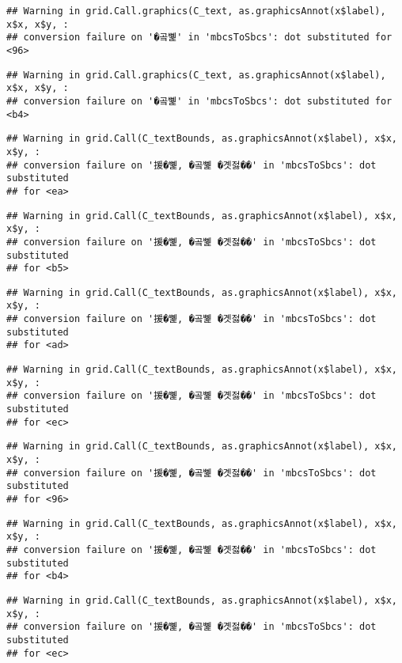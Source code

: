 \documentclass[
]{article}
\begin{document}
\begin{verbatim}
## Warning in grid.Call.graphics(C_text, as.graphicsAnnot(x$label), x$x, x$y, :
## conversion failure on '�곸뼱' in 'mbcsToSbcs': dot substituted for <96>
\end{verbatim}

\begin{verbatim}
## Warning in grid.Call.graphics(C_text, as.graphicsAnnot(x$label), x$x, x$y, :
## conversion failure on '�곸뼱' in 'mbcsToSbcs': dot substituted for <b4>
\end{verbatim}

\begin{verbatim}
## Warning in grid.Call(C_textBounds, as.graphicsAnnot(x$label), x$x, x$y, :
## conversion failure on '援�뼱, �곸뼱 �곗젏��' in 'mbcsToSbcs': dot substituted
## for <ea>
\end{verbatim}

\begin{verbatim}
## Warning in grid.Call(C_textBounds, as.graphicsAnnot(x$label), x$x, x$y, :
## conversion failure on '援�뼱, �곸뼱 �곗젏��' in 'mbcsToSbcs': dot substituted
## for <b5>
\end{verbatim}

\begin{verbatim}
## Warning in grid.Call(C_textBounds, as.graphicsAnnot(x$label), x$x, x$y, :
## conversion failure on '援�뼱, �곸뼱 �곗젏��' in 'mbcsToSbcs': dot substituted
## for <ad>
\end{verbatim}

\begin{verbatim}
## Warning in grid.Call(C_textBounds, as.graphicsAnnot(x$label), x$x, x$y, :
## conversion failure on '援�뼱, �곸뼱 �곗젏��' in 'mbcsToSbcs': dot substituted
## for <ec>
\end{verbatim}

\begin{verbatim}
## Warning in grid.Call(C_textBounds, as.graphicsAnnot(x$label), x$x, x$y, :
## conversion failure on '援�뼱, �곸뼱 �곗젏��' in 'mbcsToSbcs': dot substituted
## for <96>
\end{verbatim}

\begin{verbatim}
## Warning in grid.Call(C_textBounds, as.graphicsAnnot(x$label), x$x, x$y, :
## conversion failure on '援�뼱, �곸뼱 �곗젏��' in 'mbcsToSbcs': dot substituted
## for <b4>
\end{verbatim}

\begin{verbatim}
## Warning in grid.Call(C_textBounds, as.graphicsAnnot(x$label), x$x, x$y, :
## conversion failure on '援�뼱, �곸뼱 �곗젏��' in 'mbcsToSbcs': dot substituted
## for <ec>
\end{verbatim}
\end{document}
